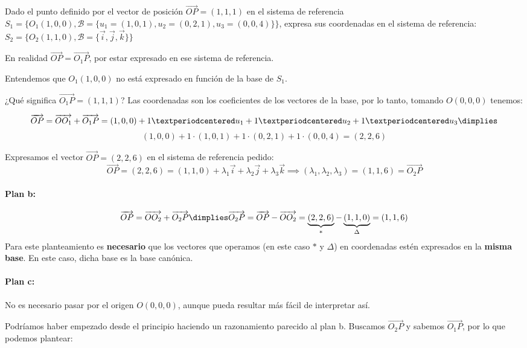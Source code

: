 \begin{problem}

Dado el punto definido por el vector de posición $\vec{OP} = (1,1,1)$ en el sistema de referencia $S_1 = \{O_1(1,0,0), \mathcal{B} = \{u_1 = (1,0,1), u_2 = (0,2,1), u_3 = (0,0,4)\}\}$, expresa sus coordenadas en el sistema de referencia: 
%
$S_2=\{O_2(1,1,0), \mathcal{B} = \{\vec{i},\vec{j},\vec{k}\}\}$

\solution

En realidad $\vec{OP} = \vec{O_1P}$, por estar expresado en ese sistema de referencia. 

Entendemos que $O_1(1,0,0)$ no está expresado en función de la base de $S_1$.

¿Qué significa $\vec{O_1P} = (1,1,1)$? Las coordenadas son los coeficientes de los vectores de la base, por lo tanto, tomando $O(0,0,0)$ tenemos:

\[
\vec{OP} = \vec{OO_1} + \vec{O_1P} = (1,0,0) + 1·u_1 + 1·u_2+ 1·u_3  \dimplies\]
\[ (1,0,0) + 1·(1,0,1) +1 ·(0,2,1)  + 1·(0,0,4) = (2,2,6)
\]

Expresamos el vector $\vec{OP}=(2,2,6)$ en el sistema de referencia pedido:
\[\vec{OP} = (2,2,6) = (1,1,0) + \lambda_1\vec{i}+ \lambda_2\vec{j}+ \lambda_3\vec{k} \implies (\lambda_1,\lambda_2,\lambda_3) = (1,1,6) = \vec{O_2P}\]

\vspace{-0.3cm}
\paragraph{Plan b:} 
\[\vec{OP} = \vec{OO_2} + \vec{O_2P} \dimplies \vec{O_2P} = \vec{OP} - \vec{OO_2} = \underbrace{(2,2,6)}_{\ast} - \underbrace{(1,1,0)}_{\Delta} = (1,1,6)\]
\obs Para este planteamiento es \textbf{necesario} que los vectores que operamos (en este caso $\ast$ y $\Delta$) en coordenadas estén expresados en la \textbf{misma base}. 
%
En este caso, dicha base es la base canónica.

\vspace{-0.3cm}
\paragraph{Plan c: } No es necesario pasar por el origen $O(0,0,0)$, aunque pueda resultar más fácil de interpretar así. 

Podríamos haber empezado desde el principio haciendo un razonamiento parecido al plan b. Buscamos $\vec{O_2P}$ y sabemos $\vec{O_1P}$, por lo que podemos plantear:


\end{problem}
